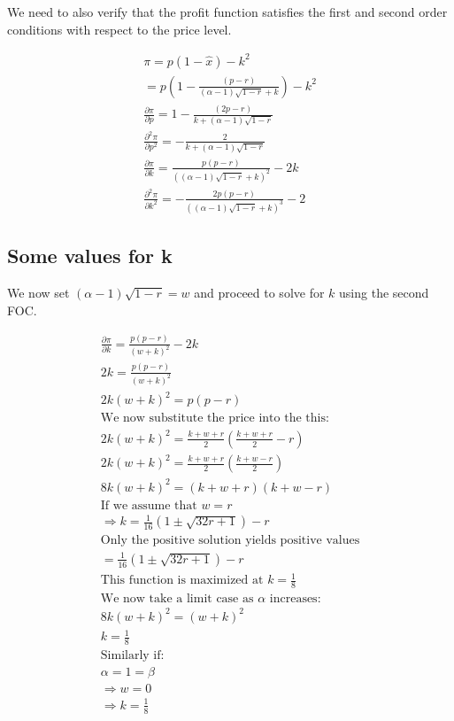\documentclass[12pt]{report}
\numberwithin{equation}{section}
\begin{document}
We need to also verify that the profit function satisfies the first and second order conditions with respect to the price level.

\begin{align*}
\pi = p\left(1-\hat{x}\right) - k^2 \\
=p\left(1-\frac{ (p-r)}{(\alpha-1)
\sqrt{ 1-r }
+k} \right) -k^2
\\
\frac{\partial \pi }{\partial p} = 1-\frac{ (2p-r)}{
k+ (\alpha-1)\sqrt{ 1 -r }} \\
\frac{\partial^2 \pi }{\partial p^2}
= -\frac{ 2}{
k+ (\alpha-1)\sqrt{ 1 -r }} \\
\frac{\partial \pi}{\partial k} = \frac{ p(p-r)}{((\alpha-1)
\sqrt{ 1-r }
+k)^2} -2k
\\
\frac{\partial^2 \pi}{\partial k^2} = -\frac{2 p(p-r)}{((\alpha-1)
\sqrt{ 1-r }
+k)^3} -2 
\end{align*}

\subsection{Some values for k}

We now set $ (\alpha-1)\sqrt{ 1 -r }=w$ and proceed to solve for $k$ using the second FOC.  

\begin{align*}
\frac{\partial \pi}{\partial k} = \frac{ p(p-r)}{(w
+k)^2} -2k \\
2k= \frac{ p(p-r)}{(w
+k)^2} \\
2k(w+k)^2=p(p-r) \\
\text{We now substitute the price into the this: } \\
2k(w+k)^2=\frac{k+ w+r}{2} \left(\frac{k+ w+r}{2}-r \right) \\
2k(w+k)^2=\frac{k+ w+r}{2} \left(\frac{k+ w-r}{2} \right) \\
8k(w+k)^2= \left( k+ w+r \right) \left(k+ w-r\right) \\
\text{If we assume that $w=r$} \\
\Rightarrow 
k = \frac{1}{16} \left(1\pm \sqrt{32 r+1}\right) - r\\
\text{Only the positive solution yields positive values} \\
= \frac{1}{16} \left(1\pm \sqrt{32 r+1}\right) - r \\
\text{This function is maximized at $k=\frac{1}{8}$} \\
\text{We now take a limit case as $\alpha$ increases:} \\
8k(w+k)^2= \left( w+ k \right)^2 \\
k = \frac{1}{8} \\
\text{Similarly if:} \\
\alpha=1=\beta \\
\Rightarrow w = 0 \\
\Rightarrow k = \frac{1}{8} 
\end{align*}
\end{document}
